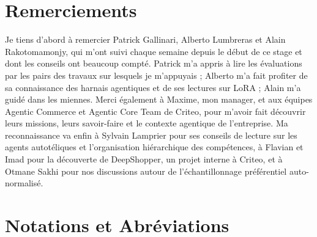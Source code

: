 \documentclass[11pt,a4paper]{article}
\begin{document}
\newpage




\section*{Remerciements}

Je tiens d'abord à remercier Patrick Gallinari, Alberto Lumbreras et Alain Rakotomamonjy, qui m'ont suivi chaque semaine depuis le début de ce stage et dont les conseils ont beaucoup compté. Patrick m'a appris à lire les évaluations par les pairs des travaux sur lesquels je m'appuyais ; Alberto m'a fait profiter de sa connaissance des harnais agentiques et de ses lectures sur LoRA ; Alain m'a guidé dans les miennes. Merci également à Maxime, mon manager, et aux équipes Agentic Commerce et Agentic Core Team de Criteo, pour m'avoir fait découvrir leurs missions, leurs savoir-faire et le contexte agentique de l'entreprise. Ma reconnaissance va enfin à Sylvain Lamprier pour ses conseils de lecture sur les agents autotéliques et l'organisation hiérarchique des compétences, à Flavian et Imad pour la découverte de DeepShopper, un projet interne à Criteo, et à Otmane Sakhi pour nos discussions autour de l'échantillonnage préférentiel auto-normalisé.



\text




\vspace{0.5cm}

\newpage
\setcounter{tocdepth}{2} %
\tableofcontents

\newpage
\section*{Notations et Abréviations}
\end{document}
